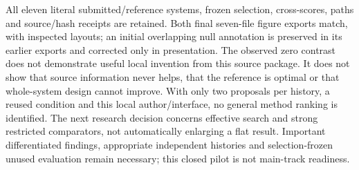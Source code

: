 All eleven literal submitted/reference systems, frozen selection, cross-scores,
paths and source/hash receipts are retained. Both final seven-file figure
exports match, with inspected layouts; an initial overlapping null annotation
is preserved in its earlier exports and corrected only in presentation.
The observed zero contrast does not demonstrate useful local invention from
this source package. It does not show that source information
never helps, that the reference is optimal or that whole-system design cannot
improve. With only two proposals per history, a reused condition and this local
author/interface, no general method ranking is identified. The next research
decision concerns effective search and strong restricted comparators, not
automatically enlarging a flat result. Important differentiated findings,
appropriate independent histories and selection-frozen unused evaluation
remain necessary; this closed pilot is not main-track readiness.
\FloatBarrier

